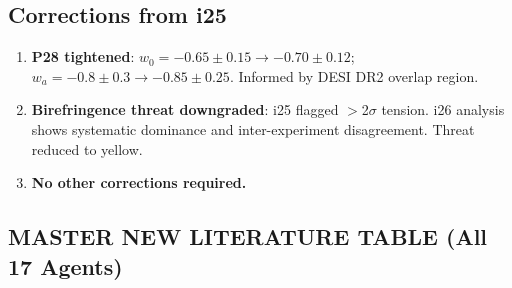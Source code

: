 \documentclass[11pt,a4paper]{article}
\begin{document}
\subsection{Corrections from i25}

\begin{enumerate}
\item \textbf{P28 tightened}: $w_0 = -0.65 \pm 0.15 \to -0.70 \pm 0.12$; $w_a = -0.8 \pm 0.3 \to -0.85 \pm 0.25$. Informed by DESI DR2 overlap region.
\item \textbf{Birefringence threat downgraded}: i25 flagged $>$2$\sigma$ tension. i26 analysis shows systematic dominance and inter-experiment disagreement. Threat reduced to yellow.
\item \textbf{No other corrections required.}
\end{enumerate}

\subsection{MASTER NEW LITERATURE TABLE (All 17 Agents)}
\end{document}
